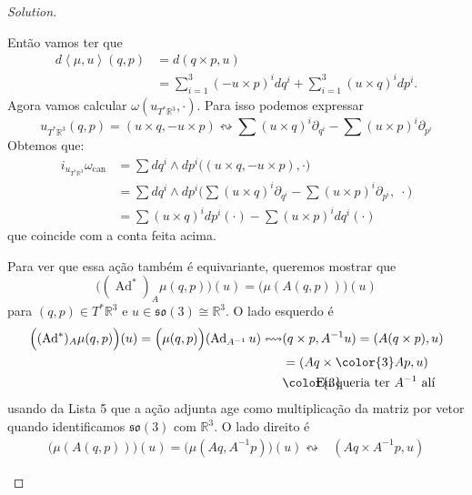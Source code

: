 \begin{proof}[Solution]
\begin{enumerate}[label=\alph*.]
Então vamos ter que
\begin{align*}
d\left<\mu,u\right>(q,p)&=d(q \times p,u)\\
&=\sum_{i=1}^3(-u \times p)^i dq^i +\sum_{i=1}^3 (u \times q)^i dp^i.
\end{align*}
Agora vamos calcular $\omega(u_{T^*\mathbb{R}^3},\cdot)$. Para isso podemos expressar
\[u_{T^*\mathbb{R}^3}(q,p)=(u\times q,-u\times p)\leftrightsquigarrow  \sum (u \times q)^i\partial_{q^i}-\sum (u \times p)^i\partial_{p^i}\]
Obtemos que:\begin{align*}
	i_{u_{T^*\mathbb{R}^3}}\omega_{\operatorname{can}}&=\sum dq^i\wedge dp^i\Big((u\times q,-u\times p),\cdot\Big)\\
	&=\sum dq^i\wedge dp^i\Big(\sum (u \times q)^i\partial_{q^i}-\sum (u \times p)^i\partial_{p^i}, \; \cdot\Big)\\
	&=\sum (u \times q)^i dp^i(\cdot) - \sum (u\times p)^i dq^i(\cdot)
	\end{align*}
	que coincide com a conta feita acima.

Para ver que essa ação também é equivariante, queremos mostrar que
\[\Big((\operatorname{Ad}^*)_A\mu(q,p)\Big)(u)=\Big(\mu(A(q,p))\Big)(u)\]
para $(q,p)\in T^*\mathbb{R}^3$ e $u\in \mathfrak{so}(3) \cong \mathbb{R}^3$. O lado esquerdo é
\begin{align*}
	\Big((\operatorname{Ad}^*)_A\mu(q,p)\Big)(u)=\Big(\mu(q,p)\Big)(\operatorname{Ad}_{A^{-1}}u)\leftrightsquigarrow &(q\times p, A^{-1}u)=(A(q\times p),u ) \\&=(Aq \times {\color{3}Ap}, u)\\ &\text{{\color{3}\hspace{-2em}Eu queria ter $A^{-1}$ alí}} 
\end{align*}
usando da Lista 5 que a ação adjunta age como multiplicação da matriz por vetor quando identificamos $\mathfrak{so}(3)$ com $\mathbb{R}^3$. O lado direito é
\begin{align*}
\Big(\mu(A(q,p))\Big)(u)=\Big(\mu(Aq,A^{-1}p)\Big)(u)\leftrightsquigarrow&(Aq \times A^{-1}p,u)
\end{align*}





\end{enumerate}
\end{proof}
